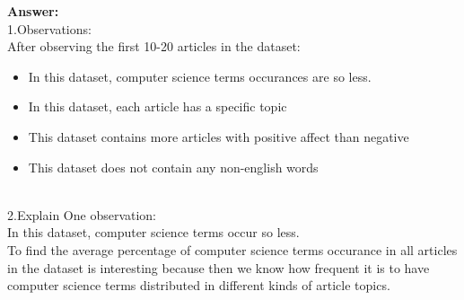 \documentclass{WeSTassignment}
\begin{document}
\textbf{Answer:} \\
1.Observations: \\
After observing the first 10-20 articles in the dataset: \\
\begin{itemize}
\item In this dataset, computer science terms occurances are so less. \\
\item In this dataset, each article has a specific topic \\
\item This dataset contains more articles with positive affect than negative \\
\item This dataset does not contain any non-english words \\ \\
\end{itemize}
2.Explain One observation: \\
In this dataset, computer science terms occur so less.\\
To find the average percentage of computer science terms occurance in all articles in the dataset is interesting because then we know how frequent it is to have computer science terms distributed in different kinds of article topics. \\ \\
\end{document}
